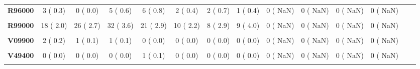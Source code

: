 \documentclass[
]{article}
\begin{document}
\begin{table}[H]
\begin{tabular}[t]{>{\raggedright\arraybackslash}p{5em}ccccccccccccc}
\textbf{R96000} & 3 (  0.3) & 0 (  0.0) & 5 (  0.6) & 6 (  0.8) & 2 (  0.4) & 2 (  0.7) & 1 (  0.4) & 0 (  NaN) & 0 (  NaN) & 0 (  NaN) & 0 (  NaN) &  & \\
\textbf{\cellcolor{gray!10}{R98000}} & \cellcolor{gray!10}{1 (  0.1)} & \cellcolor{gray!10}{0 (  0.0)} & \cellcolor{gray!10}{1 (  0.1)} & \cellcolor{gray!10}{0 (  0.0)} & \cellcolor{gray!10}{0 (  0.0)} & \cellcolor{gray!10}{0 (  0.0)} & \cellcolor{gray!10}{0 (  0.0)} & \cellcolor{gray!10}{0 (  NaN)} & \cellcolor{gray!10}{0 (  NaN)} & \cellcolor{gray!10}{0 (  NaN)} & \cellcolor{gray!10}{0 (  NaN)} & \cellcolor{gray!10}{} & \cellcolor{gray!10}{}\\
\textbf{R99000} & 18 (  2.0) & 26 (  2.7) & 32 (  3.6) & 21 (  2.9) & 10 (  2.2) & 8 (  2.9) & 9 (  4.0) & 0 (  NaN) & 0 (  NaN) & 0 (  NaN) & 0 (  NaN) &  & \\
\textbf{\cellcolor{gray!10}{R99999}} & \cellcolor{gray!10}{8 (  0.9)} & \cellcolor{gray!10}{9 (  0.9)} & \cellcolor{gray!10}{8 (  0.9)} & \cellcolor{gray!10}{2 (  0.3)} & \cellcolor{gray!10}{1 (  0.2)} & \cellcolor{gray!10}{2 (  0.7)} & \cellcolor{gray!10}{1 (  0.4)} & \cellcolor{gray!10}{0 (  NaN)} & \cellcolor{gray!10}{0 (  NaN)} & \cellcolor{gray!10}{0 (  NaN)} & \cellcolor{gray!10}{0 (  NaN)} & \cellcolor{gray!10}{} & \cellcolor{gray!10}{}\\
\textbf{V09900} & 2 (  0.2) & 1 (  0.1) & 1 (  0.1) & 0 (  0.0) & 0 (  0.0) & 0 (  0.0) & 0 (  0.0) & 0 (  NaN) & 0 (  NaN) & 0 (  NaN) & 0 (  NaN) &  & \\
\textbf{\cellcolor{gray!10}{V29400}} & \cellcolor{gray!10}{0 (  0.0)} & \cellcolor{gray!10}{0 (  0.0)} & \cellcolor{gray!10}{0 (  0.0)} & \cellcolor{gray!10}{1 (  0.1)} & \cellcolor{gray!10}{0 (  0.0)} & \cellcolor{gray!10}{0 (  0.0)} & \cellcolor{gray!10}{0 (  0.0)} & \cellcolor{gray!10}{0 (  NaN)} & \cellcolor{gray!10}{0 (  NaN)} & \cellcolor{gray!10}{0 (  NaN)} & \cellcolor{gray!10}{0 (  NaN)} & \cellcolor{gray!10}{} & \cellcolor{gray!10}{}\\
\textbf{V49400} & 0 (  0.0) & 0 (  0.0) & 0 (  0.0) & 1 (  0.1) & 0 (  0.0) & 0 (  0.0) & 0 (  0.0) & 0 (  NaN) & 0 (  NaN) & 0 (  NaN) & 0 (  NaN) &  & \\
\textbf{\cellcolor{gray!10}{V49500}} & \cellcolor{gray!10}{0 (  0.0)} & \cellcolor{gray!10}{0 (  0.0)} & \cellcolor{gray!10}{1 (  0.1)} & \cellcolor{gray!10}{0 (  0.0)} & \cellcolor{gray!10}{0 (  0.0)} & \cellcolor{gray!10}{0 (  0.0)} & \cellcolor{gray!10}{0 (  0.0)} & \cellcolor{gray!10}{0 (  NaN)} & \cellcolor{gray!10}{0 (  NaN)} & \cellcolor{gray!10}{0 (  NaN)} & \cellcolor{gray!10}{0 (  NaN)} & \cellcolor{gray!10}{} & \cellcolor{gray!10}{}\\

\end{tabular}
\end{table}
\end{document}
